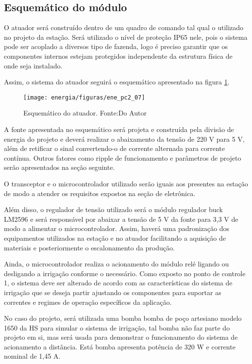\subsection{Esquemático do módulo}

O atuador será construído dentro de um quadro de comando tal qual o utilizado no projeto da estação. Será utilizado o nível de proteção IP65 nele, pois o sistema pode ser acoplado a diversos tipo de fazenda, logo é preciso garantir que os componentes internos estejam protegidos independente da estrutura física de onde seja instalado.

Assim, o sistema do atuador seguirá o esquemático apresentado na figura \ref{ene_pc2_07}.

\begin{figure}[H]
		\centering
		\texttt{[image: energia/figuras/ene\_pc2\_07]}
		\caption{Esquemático do atuador. Fonte:Do Autor}
		\label{ene_pc2_07}
\end{figure}

A fonte apresentada no esquemático será projeta e construída pela divisão de energia do projeto e deverá realizar o abaixamento da tensão de 220 V para 5 V, além de retificar o sinal convertendo-o de corrente alternada para corrente contínua. Outros fatores como ripple de funcionamento e parâmetros de projeto serão apresentados na seção seguinte.

O transceptor e o microcontrolador utilizado serão iguais aos presentes na estação de modo a atender os requisitos expostos na seção de eletrônica. 

Além disso, o regulador de tensão utilizado será o módulo regulador buck LM2596 e será responsável por abaixar a tensão de 5 V da fonte para 3,3 V de modo a alimentar o microcontrolador. Assim, haverá uma padronização dos equipamentos utilizados na estação e no atuador facilitando a aquisição de materiais e posteriormente o escalonamento da produção.

Ainda, o microcontrolador realiza o acionamento do módulo relé ligando ou desligando a irrigação conforme o necessário. Como exposto no ponto de controle 1, o sistema deve ser alterado de acordo com as características do sistema de irrigação que se deseja partir ajustando os componentes para suportar as correntes e regimes de operação específicos da aplicação. 

No caso do projeto, será utilizada uma bomba bomba de poço artesiano modelo 1650 da HS para simular o sistema de irrigação, tal bomba não faz parte do projeto em si, mas será usada para demonstrar o funcionamento do sistema de acionamento a distância. Está bomba apresenta potência de 320 W e corrente nominal de 1,45 A.

